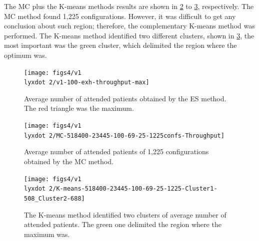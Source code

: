 The MC plus the K-means methods results are shown in \ref{subfig:mc16-5}
to \ref{subfig:km16-5}, respectively. The MC method found 1,225 configurations.
However, it was difficult to get any conclusion about such region;
therefore, the complementary K-means method was performed. The K-means
method identified two different clusters, shown in \ref{subfig:km16-5},
the most important was the green cluster, which delimited the region
where the optimum was.
\begin{figure}[H]
\centering{}\texttt{[image: figs4/v1\\lyxdot 2/v1-100-exh-throughput-max]}\caption{Average number of attended patients obtained by the ES method. The
red triangle was the maximum.\label{subfig:es16-5}}
\end{figure}
\begin{figure}[H]
\centering{}\texttt{[image: figs4/v1\\lyxdot 2/MC-518400-23445-100-69-25-1225confs-Throughput]}\caption{Average number of attended patients of 1,225 configurations obtained
by the MC method.\label{subfig:mc16-5}}
\end{figure}
\begin{figure}[H]
\begin{centering}
\texttt{[image: figs4/v1\\lyxdot 2/K-means-518400-23445-100-69-25-1225-Cluster1-508\_Cluster2-688]}
\par\end{centering}

\caption{The K-means method identified two clusters of average number of attended
patients. The green one delimited the region where the maximum was.\label{subfig:km16-5}}
\end{figure}


